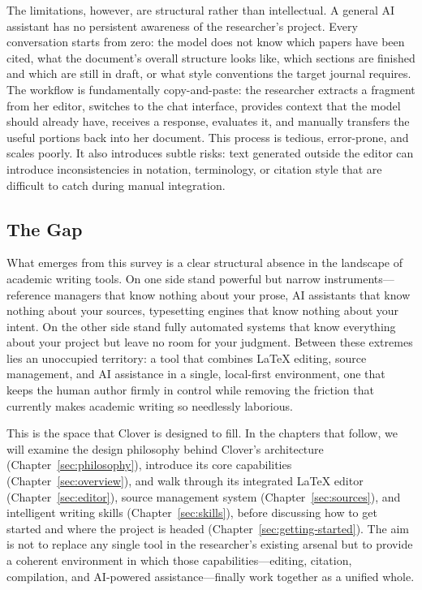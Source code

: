 \documentclass[a4paper,11pt]{article}
\begin{document}
The limitations, however, are structural rather than intellectual. A general AI assistant has no persistent awareness of the researcher's project. Every conversation starts from zero: the model does not know which papers have been cited, what the document's overall structure looks like, which sections are finished and which are still in draft, or what style conventions the target journal requires. The workflow is fundamentally copy-and-paste: the researcher extracts a fragment from her editor, switches to the chat interface, provides context that the model should already have, receives a response, evaluates it, and manually transfers the useful portions back into her document. This process is tedious, error-prone, and scales poorly. It also introduces subtle risks: text generated outside the editor can introduce inconsistencies in notation, terminology, or citation style that are difficult to catch during manual integration.

\subsection{The Gap}

What emerges from this survey is a clear structural absence in the landscape of academic writing tools. On one side stand powerful but narrow instruments---reference managers that know nothing about your prose, AI assistants that know nothing about your sources, typesetting engines that know nothing about your intent. On the other side stand fully automated systems that know everything about your project but leave no room for your judgment. Between these extremes lies an unoccupied territory: a tool that combines LaTeX editing, source management, and AI assistance in a single, local-first environment, one that keeps the human author firmly in control while removing the friction that currently makes academic writing so needlessly laborious.

This is the space that Clover is designed to fill. In the chapters that follow, we will examine the design philosophy behind Clover's architecture (Chapter~\ref{sec:philosophy}), introduce its core capabilities (Chapter~\ref{sec:overview}), and walk through its integrated LaTeX editor (Chapter~\ref{sec:editor}), source management system (Chapter~\ref{sec:sources}), and intelligent writing skills (Chapter~\ref{sec:skills}), before discussing how to get started and where the project is headed (Chapter~\ref{sec:getting-started}). The aim is not to replace any single tool in the researcher's existing arsenal but to provide a coherent environment in which those capabilities---editing, citation, compilation, and AI-powered assistance---finally work together as a unified whole.
\end{document}
